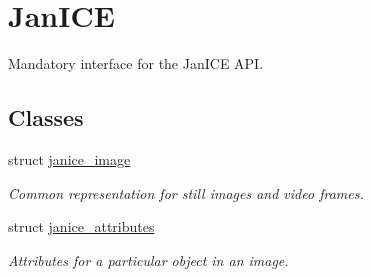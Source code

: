 \hypertarget{group__janice}{}\section{Jan\+I\+C\+E}
\label{group__janice}


Mandatory interface for the Jan\+I\+C\+E A\+P\+I.  


\subsection*{Classes}
\begin{DoxyCompactItemize}
\item 
struct \hyperlink{structjanice__image}{janice\+\_\+image}
\begin{DoxyCompactList}\small\item\em Common representation for still images and video frames. \end{DoxyCompactList}\item 
struct \hyperlink{structjanice__attributes}{janice\+\_\+attributes}
\begin{DoxyCompactList}\small\item\em Attributes for a particular object in an image. \end{DoxyCompactList}\end{DoxyCompactItemize}
